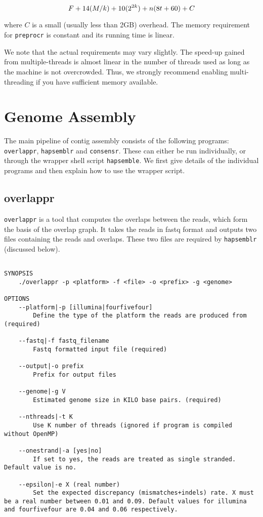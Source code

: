 \documentclass[12pt,a4paper]{report}
\begin{document}
\begin{equation}
F + 14(M/k) + 10(2^{2k}) + n(8t + 60) + C \\
\end{equation}

where $C$ is a small (usually less than 2GB) overhead. The memory requirement for \texttt{preprocr} is constant and its running time is linear.

We note that the actual requirements may vary slightly. The speed-up gained from multiple-threads is almost linear in the number of threads used as long as the machine is not overcrowded. Thus, we strongly recommend enabling multi-threading if you have sufficient memory available. 

\section{Genome Assembly}
\label{assem}

The main pipeline of contig assembly consists of the following programs: \texttt{overlappr}, \texttt{hapsemblr} and \texttt{consensr}. These can either be run individually, or through the wrapper shell script \texttt{hapsemble}. We first give details of the individual programs and then explain how to use the wrapper script.

\subsection{overlappr}

\texttt{overlappr} is a tool that computes the overlaps between the reads, which form the basis of the overlap graph. It takes the reads in fastq format and outputs two files containing the reads and overlaps. These two files are required by \texttt{hapsemblr} (discussed below).

\begin{lstlisting}

SYNOPSIS
    ./overlappr -p <platform> -f <file> -o <prefix> -g <genome>

OPTIONS 
    --platform|-p [illumina|fourfivefour] 
        Define the type of the platform the reads are produced from (required) 

    --fastq|-f fastq_filename 
        Fastq formatted input file (required) 

    --output|-o prefix 
        Prefix for output files 

    --genome|-g V 
        Estimated genome size in KILO base pairs. (required) 

    --nthreads|-t K 
        Use K number of threads (ignored if program is compiled without OpenMP) 

    --onestrand|-a [yes|no] 
        If set to yes, the reads are treated as single stranded. Default value is no. 

    --epsilon|-e X (real number) 
        Set the expected discrepancy (mismatches+indels) rate. X must be a real number between 0.01 and 0.09. Default values for illumina and fourfivefour are 0.04 and 0.06 respectively. 

\end{lstlisting}
\end{document}
